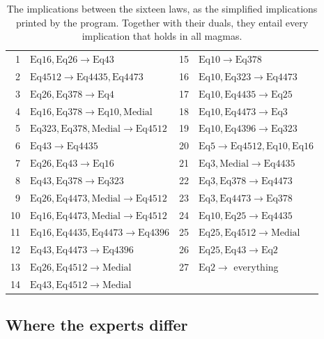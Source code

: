 \documentclass[11pt,a4paper]{article}
\theoremstyle{definition}
\theoremstyle{remark}
\newcommand{\Eq}[1]{\mathrm{Eq}#1}
\begin{document}
\begin{table}[ht]
\centering
\small
\begin{tabular}{@{}rl@{\quad}rl@{}}
\toprule
1 & $\Eq{16}, \Eq{26} \to \Eq{43}$ &
15 & $\Eq{10} \to \Eq{378}$ \\
2 & $\Eq{4512} \to \Eq{4435}, \Eq{4473}$ &
16 & $\Eq{10}, \Eq{323} \to \Eq{4473}$ \\
3 & $\Eq{26}, \Eq{378} \to \Eq{4}$ &
17 & $\Eq{10}, \Eq{4435} \to \Eq{25}$ \\
4 & $\Eq{16}, \Eq{378} \to \Eq{10}, \text{Medial}$ &
18 & $\Eq{10}, \Eq{4473} \to \Eq{3}$ \\
5 & $\Eq{323}, \Eq{378}, \text{Medial} \to \Eq{4512}$ &
19 & $\Eq{10}, \Eq{4396} \to \Eq{323}$ \\
6 & $\Eq{43} \to \Eq{4435}$ &
20 & $\Eq{5} \to \Eq{4512}, \Eq{10}, \Eq{16}$ \\
7 & $\Eq{26}, \Eq{43} \to \Eq{16}$ &
21 & $\Eq{3}, \text{Medial} \to \Eq{4435}$ \\
8 & $\Eq{43}, \Eq{378} \to \Eq{323}$ &
22 & $\Eq{3}, \Eq{378} \to \Eq{4473}$ \\
9 & $\Eq{26}, \Eq{4473}, \text{Medial} \to \Eq{4512}$ &
23 & $\Eq{3}, \Eq{4473} \to \Eq{378}$ \\
10 & $\Eq{16}, \Eq{4473}, \text{Medial} \to \Eq{4512}$ &
24 & $\Eq{10}, \Eq{25} \to \Eq{4435}$ \\
11 & $\Eq{16}, \Eq{4435}, \Eq{4473} \to \Eq{4396}$ &
25 & $\Eq{25}, \Eq{4512} \to \text{Medial}$ \\
12 & $\Eq{43}, \Eq{4473} \to \Eq{4396}$ &
26 & $\Eq{25}, \Eq{43} \to \Eq{2}$ \\
13 & $\Eq{26}, \Eq{4512} \to \text{Medial}$ &
27 & $\Eq{2} \to$ everything \\
14 & $\Eq{43}, \Eq{4512} \to \text{Medial}$ & & \\
\bottomrule
\end{tabular}
\caption{The implications between the sixteen laws, as the simplified implications printed by the program. Together with their duals, they entail every implication that holds in all magmas.}\label{tab:basis16}
\end{table}

\subsection{Where the experts differ}
\end{document}
